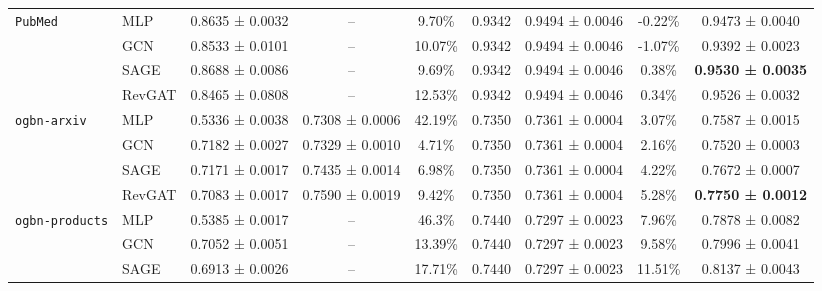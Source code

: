 \documentclass{article}
\begin{document}
\begin{table}[!ht]
\begin{tabular}{llccccccc}
         \\
         \midrule
    \multirow{3}{*}{\texttt{PubMed}} 
    & {MLP}
         & 0.8635 ± 0.0032
         & {--}
         & 9.70\%
         & {0.9342}
         & {0.9494 ± 0.0046}
         & -0.22\%
         & 0.9473 ± 0.0040
         \\
         & GCN 
         & 0.8533 ± 0.0101
         & --
         & 10.07\%
         & 0.9342
         & 0.9494 ± 0.0046
         & -1.07\%
         & 0.9392 ± 0.0023
         \\
         & SAGE
         & 0.8688 ± 0.0086
         & --
         & 9.69\%
         & 0.9342
         & 0.9494 ± 0.0046
         & 0.38\%
         & \textbf{0.9530 ± 0.0035}
         \\
         & RevGAT
         & 0.8465 ± 0.0808
         & --
         & 12.53\%
         & 0.9342
         & 0.9494 ± 0.0046
         & 0.34\%
         & 0.9526 ± 0.0032
         \\
         \midrule
    \multirow{3}{*}{\texttt{ogbn-arxiv}}
    & {MLP}
         & {0.5336 ± 0.0038}
         & {0.7308 ± 0.0006}
         & {42.19\%}
         & {0.7350}
         & {0.7361 ± 0.0004}
         & {3.07\%}
         & {0.7587 ± 0.0015}
         \\
         & GCN 
         & 0.7182 ± 0.0027
         & 0.7329 ± 0.0010
         & 4.71\%
         & 0.7350
         & 0.7361 ± 0.0004
         & 2.16\%
         & 0.7520 ± 0.0003
         \\
         & SAGE
         & 0.7171 ± 0.0017
         & 0.7435 ± 0.0014
         & 6.98\%
         & 0.7350
         & 0.7361 ± 0.0004
         & 4.22\%
         & 0.7672 ± 0.0007
         \\
         & RevGAT
         & 0.7083 ± 0.0017
         & 0.7590 ± 0.0019
         & 9.42\%
         & 0.7350
         & 0.7361 ± 0.0004
         & 5.28\%
         & \textbf{0.7750 ± 0.0012}
         \\
         \midrule
         \multirow{4}{*}{\texttt{ogbn-products}}
         &MLP 
         & 0.5385 ± 0.0017
         & --
         & 46.3\%
         & {0.7440}
         & {0.7297 ± 0.0023}
         & 7.96\%
         & 0.7878 ± 0.0082
         \\
          & {GCN}
    & 0.7052 ± 0.0051
    & {--}
    & 13.39\%
    & {0.7440}
    & {0.7297 ± 0.0023}
    & 9.58\% 
    & 0.7996 ± 0.0041
    \\
     & {SAGE}
    & 0.6913 ± 0.0026
    & {--}
    & 17.71\%
    & {0.7440}
    & {0.7297 ± 0.0023}
    & 11.51\% 
    & 0.8137 ± 0.0043

\end{tabular}
\end{table}
\end{document}
